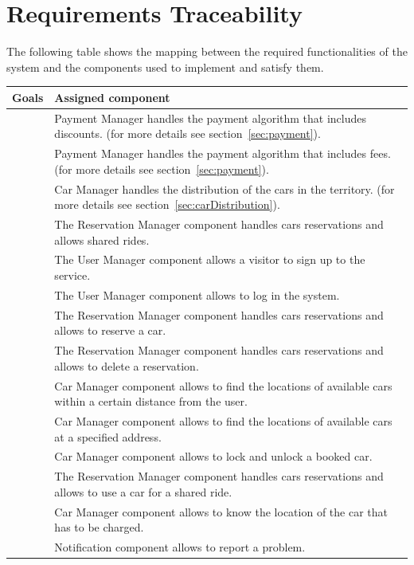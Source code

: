 \documentclass{article}
\begin{document}
	\section{Requirements Traceability}
	The following table shows the mapping between the required functionalities of the system and the components used to implement and satisfy them.
	
	\begin{center}
		\begin{longtable}{ p{7cm}  p{8cm} }\\ \hline
			\centerline{\textbf{Goals}} & \centerline{\textbf{Assigned component}} \\\hline
			\gSystemDiscounts & Payment Manager handles the payment algorithm that includes discounts. (for more details see section~\ref{sec:payment}).\\\hline
			\gSystemFees &  Payment Manager handles the payment algorithm that includes fees. (for more details see section~\ref{sec:payment}).\\\hline
			\gSystemDistribution & Car Manager handles the distribution of the cars in the territory. (for more details see section~\ref{sec:carDistribution}).\\\hline
			\gSystemShare & The Reservation Manager component handles cars reservations and allows shared rides.\\\hline
			\gVisitorSignUp & The User Manager component allows a visitor to sign up to the service.\\\hline
			\gRegisteredLogin & The User Manager component allows to log in the system.\\\hline
			\gRegisteredReserve & The Reservation Manager component handles cars reservations and allows to reserve a car.\\\hline
			\gRegisteredDeleteReservation & The Reservation Manager component handles cars reservations and allows to delete a reservation.\\\hline
			\gRegisteredSearchDistance & Car Manager component allows to find the locations of available cars within a certain distance from the user.\\\hline
			\gRegisteredSearchAddress &  Car Manager component allows to find the locations of available cars at a specified address.\\\hline
			\gRegisteredLockUnlock & Car Manager component allows to lock and unlock a booked car.\\\hline
			\gPassengerShare &  The Reservation Manager component handles cars reservations and allows to use a car for a shared ride.\\\hline
			\gHandymanRecharge & Car Manager component allows to know the location of the car that has to be charged.\\\hline
			\gHandymanReportIssue & Notification component allows to report a problem.\\\hline
		\end{longtable}
	\end{center} 
	\pagebreak
	
\end{document}
